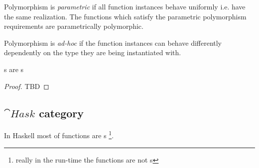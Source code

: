 \begin{definition}
\label{def:pp_function}
Polymorphism is \textit{parametric} if all function instances behave uniformly
i.e. have the same realization. The functions which satisfy the
parametric polymorphism requirements are parametrically polymorphic.
\end{definition}

\begin{definition}
\label{def:ad_hoc_polymorphism}
Polymorphism is \textit{ad-hoc} if the function instances can behave
differently dependently on the type they are being instantiated with. 
\end{definition}

\begin{theorem}[Reynolds]
\label{thm:reynolds}
s are s 
\begin{proof}
TBD
\end{proof}
\end{theorem}

\subsection{$\cat{Hask}$ category}

In Haskell most of functions are s 
\footnote{really in the run-time the functions are not
  s}.  

